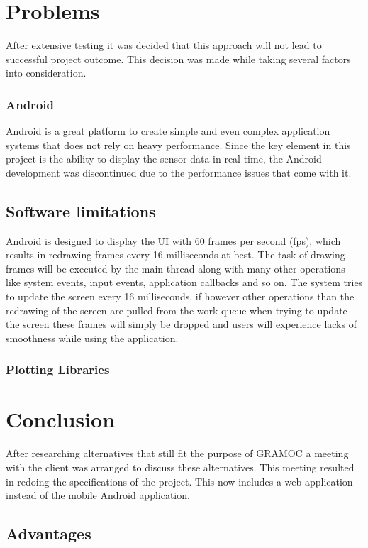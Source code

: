 \chapter{Problems}
\label{ch:Problems}

After extensive testing it was decided that this approach will not lead to successful project outcome. This decision was made while taking several factors into consideration.

\subsection{Android}
Android is a great platform to create simple and even complex application systems that does not rely on heavy performance. Since the key element in this project is the ability to display the sensor data in real time, the Android development was discontinued due to the performance issues that come with it.

\section{Software limitations}
Android is designed to display the UI with 60 frames per second (fps), which results in redrawing frames every 16 milliseconds at best. The task of drawing frames will be executed by the main thread along with many other operations like system events, input events, application callbacks and so on. The system tries to update the screen every 16 milliseconds, if however other operations than the redrawing of the screen are pulled from the work queue when trying to update the screen these frames will simply be dropped and users will experience lacks of smoothness while using the application.

\subsection{Plotting Libraries}

\chapter{Conclusion}
After researching alternatives that still fit the purpose of GRAMOC a meeting with the client was arranged to discuss these alternatives. This meeting resulted in redoing the specifications of the project. This now includes a web application instead of the mobile Android application.

\section{Advantages}

